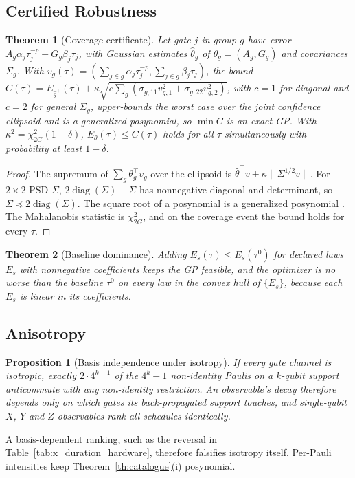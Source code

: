 \documentclass[10pt,letterpaper,journal]{IEEEtran}
\newtheorem{theorem}{Theorem}
\newtheorem{proposition}{Proposition}
\begin{document}
\subsection{Certified Robustness}
\begin{theorem}[Coverage certificate]\label{th:coverage}
Let gate $j$ in group $g$ have error $A_g\alpha_j\tau_j^{-p}+G_g\beta_j\tau_j$, with Gaussian estimates $\hat\theta_g$ of $\theta_g=(A_g,G_g)$ and covariances $\Sigma_g$. With $v_g(\tau)=(\sum_{j\in g}\alpha_j\tau_j^{-p},\sum_{j\in g}\beta_j\tau_j)$, the bound $C(\tau)=E_{\hat\theta^+}(\tau)+\kappa\sqrt{c\sum_g(\sigma_{g,11}v_{g,1}^2+\sigma_{g,22}v_{g,2}^2)}$, with $c=1$ for diagonal and $c=2$ for general $\Sigma_g$, upper-bounds the worst case over the joint confidence ellipsoid and is a generalized posynomial, so $\min C$ is an exact GP. With $\kappa^2=\chi^2_{2G}(1-\delta)$, $E_\theta(\tau)\le C(\tau)$ holds for all $\tau$ simultaneously with probability at least $1-\delta$.
\end{theorem}
\begin{proof}
The supremum of $\sum_g\theta_g^\top v_g$ over the ellipsoid is $\hat\theta^\top v+\kappa\|\Sigma^{1/2}v\|$. For $2\times2$ PSD $\Sigma$, $2\operatorname{diag}(\Sigma)-\Sigma$ has nonnegative diagonal and determinant, so $\Sigma\preceq2\operatorname{diag}(\Sigma)$. The square root of a posynomial is a generalized posynomial \cite{boydgp}. The Mahalanobis statistic is $\chi^2_{2G}$, and on the coverage event the bound holds for every $\tau$.
\end{proof}
\begin{theorem}[Baseline dominance]\label{th:dominance}
Adding $E_s(\tau)\le E_s(\tau^0)$ for declared laws $E_s$ with nonnegative coefficients keeps the GP feasible, and the optimizer is no worse than the baseline $\tau^0$ on every law in the convex hull of $\{E_s\}$, because each $E_s$ is linear in its coefficients.
\end{theorem}

\subsection{Anisotropy}
\begin{proposition}[Basis independence under isotropy]\label{prop:iso}
If every gate channel is isotropic, exactly $2\cdot4^{k-1}$ of the $4^k-1$ non-identity Paulis on a $k$-qubit support anticommute with any non-identity restriction. An observable's decay therefore depends only on which gates its back-propagated support touches, and single-qubit $X$, $Y$ and $Z$ observables rank all schedules identically.
\end{proposition}
A basis-dependent ranking, such as the reversal in Table~\ref{tab:x_duration_hardware}, therefore falsifies isotropy itself. Per-Pauli intensities keep Theorem~\ref{th:catalogue}(i) posynomial.
\end{document}

